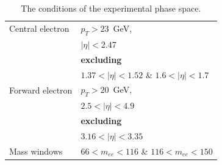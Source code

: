 \begin{table}
\centering
\begin{tabular}{l l}
\hline \hline
Central electron & $p_T > 23$~GeV, \\
\rule{0pt}{4ex}  & $|\eta| < 2.47$ \\
                 & {\bf excluding} \\
                 & $1.37 < |\eta| < 1.52$ \& $1.6 < |\eta| < 1.7$ \\
\hline
Forward electron & $p_T > 20$~GeV, \\
\rule{0pt}{4ex}  & $2.5 < |\eta| < 4.9$ \\
                 & {\bf excluding} \\
                 & $3.16 < |\eta| < 3.35$ \\
\hline
Mass windows     & $66 < m_{ee} < 116$ \& $116 < m_{ee} < 150$ \\
\hline \hline
\end{tabular}
\caption{The conditions of the experimental phase space.}
\label{tab:res_phase_space}
\end{table}


\begin{figure}
\end{figure}

